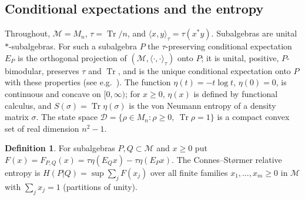 \documentclass[11pt]{article}
\DeclareMathOperator{\Tr}{Tr}
\newcommand{\M}{\mathcal{M}}
\newcommand{\D}{\mathcal{D}}
\theoremstyle{plain}
\theoremstyle{definition}
\newtheorem{definition}[theorem]{Definition}
\theoremstyle{remark}
\begin{document}
\subsection{Conditional expectations and the entropy}

Throughout, $\M=M_n$, $\tau=\Tr/n$, and $\langle x,y\rangle_\tau=\tau(x^*y)$. Subalgebras are unital $*$-subalgebras. For such
a subalgebra $P$ the $\tau$-preserving conditional expectation $E_P$ is the orthogonal projection of $(\M,\langle\cdot,\cdot
\rangle_\tau)$ onto $P$; it is unital, positive, $P$-bimodular, preserves $\tau$ and $\Tr$, and is the unique conditional
expectation onto $P$ with these properties (see e.g.~\cite{takesaki2002}). The function $\eta(t)=-t\log t$, $\eta(0)=0$, is
continuous and concave on $[0,\infty)$; for $x\ge0$, $\eta(x)$ is defined by functional calculus, and
$S(\sigma)=\Tr\eta(\sigma)$ is the von Neumann entropy of a density matrix $\sigma$. The state space
$\D=\{\rho\in M_n:\rho\ge0,\ \Tr\rho=1\}$ is a compact convex set of real dimension $n^2-1$.

\begin{definition}\label{def:cs}
For subalgebras $P,Q\subset\M$ and $x\ge0$ put $F(x)=F_{P,Q}(x)=\tau\eta(E_Qx)-\tau\eta(E_Px)$. The Connes--St{\o}rmer relative
entropy is $H(P|Q)=\sup\sum_jF(x_j)$ over all finite families $x_1,\dots,x_m\ge0$ in $\M$ with $\sum_jx_j=1$ (partitions
of unity).
\end{definition}
\end{document}
